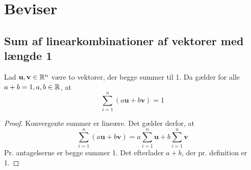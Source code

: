 \documentclass[../main.tex]{subfiles}
\begin{document}
\appendix
\chapter{Beviser}
\section{Sum af linearkombinationer af vektorer med længde 1}
\begin{theorem}\label{app:vsum}
	Lad $ \mathbf u, \mathbf v\in\mathbb R^n $ være to vektorer, der begge summer til 1.
	Da gælder for alle $ a+b=1, a, b\in\mathbb R $, at
	\begin{equation*}
		\sum_{i=1}^n(a\mathbf u+b\mathbf v)=1
	\end{equation*}
\end{theorem}
\begin{proof}
	Konvergente summer er lineære.
	Det gælder derfor, at
	\begin{equation*}
		\sum_{i=1}^n(a\mathbf u+b\mathbf v)
		=a\sum_{i=1}^n \mathbf u+b\sum_{i=1}^n \mathbf v
	\end{equation*}
	Pr. antagelserne er begge summer 1.
	Det efterlader $ a+b $, der pr. definition er 1.
\end{proof}
\end{document}
